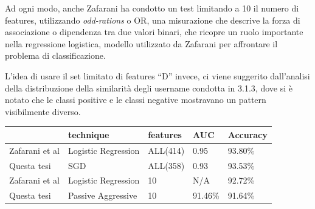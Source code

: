 Ad ogni modo, anche Zafarani ha condotto un test limitando a 10 il numero di features, utilizzando \textit{odd-rations} o OR, una misurazione che descrive la forza di associazione o dipendenza tra due valori binari, che ricopre un ruolo importante nella regressione logistica, modello utilizzato da Zafarani per affrontare il problema di classificazione.

L'idea di usare il set limitato di features “D” invece, ci viene suggerito dall'analisi della distribuzione della similarità degli username condotta in 3.1.3, dove si è notato che le classi positive e le classi negative mostravano un pattern visibilmente diverso.\newline

\begin{tabular}{ |l|l|l|l|l| }
	\hline
	& \textbf{technique} & \textbf{features} & \textbf{AUC} & \textbf{Accuracy} \\ \hline
	Zafarani et al & Logistic Regression & ALL(414) & 0.95 & 93.80\% \\ \hline
	Questa tesi &  SGD & ALL(358) & 0.93 & 93.53\% \\ \hline
	Zafarani et al & Logistic Regression & 10 & N/A & 92.72\% \\ \hline
	Questa tesi & Passive Aggressive & 10 & 91.46\% & 91.64\% \\
	\hline
\end{tabular}
\newline\newline
